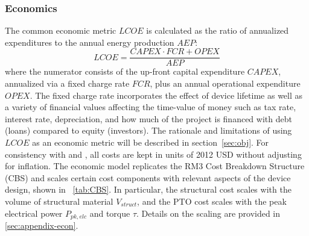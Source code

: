 \subsubsection{Economics}\label{sec:econ}
The common economic metric $LCOE$ is calculated as the ratio of annualized expenditures to the annual energy production $AEP$:
\begin{equation}
	LCOE = \frac{CAPEX\cdot  FCR + OPEX}{AEP}
\end{equation}
where the numerator consists of the up-front capital expenditure $CAPEX$, annualized via a fixed charge rate $FCR$, plus an annual operational expenditure $OPEX$.
The fixed charge rate incorporates the effect of device lifetime as well as a variety of financial values affecting the time-value of money such as tax rate, interest rate, depreciation, and how much of the project is financed with debt (loans) compared to equity (investors).
The rationale and limitations of using $LCOE$ as an economic metric will be described in section~\ref{sec:obj}.
For consistency with \cite{neary_reference_2014} and \cite{RM3}, all costs are kept in units of 2012 USD without adjusting for inflation.
The economic model replicates the RM3 Cost Breakdown Structure (CBS) \cite{neary_reference_2014} and scales certain cost components with relevant aspects of the device design, shown in \tablename~\ref{tab:CBS}.
In particular, the structural cost scales with the volume of structural material $V_{struct}$, and the PTO cost scales with the peak electrical power $P_{pk,elc}$ and torque $\tau$.
Details on the scaling are provided in \appendixname \ref{sec:appendix-econ}.
